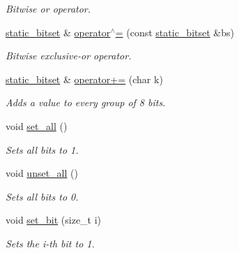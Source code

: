\begin{DoxyCompactItemize}
\begin{DoxyCompactList}\small\item\em Bitwise {\itshape or} operator. \end{DoxyCompactList}\item 
\hyperlink{classlgraph_1_1utils_1_1static__bitset}{static\+\_\+bitset} \& \hyperlink{classlgraph_1_1utils_1_1static__bitset_a2f07c03e35d9a5661cf573ed1eb379a6}{operator$^\wedge$=} (const \hyperlink{classlgraph_1_1utils_1_1static__bitset}{static\+\_\+bitset} \&bs)
\begin{DoxyCompactList}\small\item\em Bitwise {\itshape exclusive-\/or} operator. \end{DoxyCompactList}\item 
\hyperlink{classlgraph_1_1utils_1_1static__bitset}{static\+\_\+bitset} \& \hyperlink{classlgraph_1_1utils_1_1static__bitset_a2c595a4b2c3ab2bbd72c1dad0504cc38}{operator+=} (char k)
\begin{DoxyCompactList}\small\item\em Adds a value to every group of 8 bits. \end{DoxyCompactList}\item 
\mbox{\label{classlgraph_1_1utils_1_1static__bitset_a95f2e92b2b44f7e84e0131a7bf04402d}} 
void \hyperlink{classlgraph_1_1utils_1_1static__bitset_a95f2e92b2b44f7e84e0131a7bf04402d}{set\+\_\+all} ()
\begin{DoxyCompactList}\small\item\em Sets all bits to 1. \end{DoxyCompactList}\item 
\mbox{\label{classlgraph_1_1utils_1_1static__bitset_a38f34197224e168f40b5370c23c4243d}} 
void \hyperlink{classlgraph_1_1utils_1_1static__bitset_a38f34197224e168f40b5370c23c4243d}{unset\+\_\+all} ()
\begin{DoxyCompactList}\small\item\em Sets all bits to 0. \end{DoxyCompactList}\item 
\mbox{\label{classlgraph_1_1utils_1_1static__bitset_ac78088fe22921e615bbe49f05c4d794a}} 
void \hyperlink{classlgraph_1_1utils_1_1static__bitset_ac78088fe22921e615bbe49f05c4d794a}{set\+\_\+bit} (size\+\_\+t i)
\begin{DoxyCompactList}\small\item\em Sets the {\itshape i-\/th} bit to 1. \end{DoxyCompactList}\item 

\end{DoxyCompactItemize}
